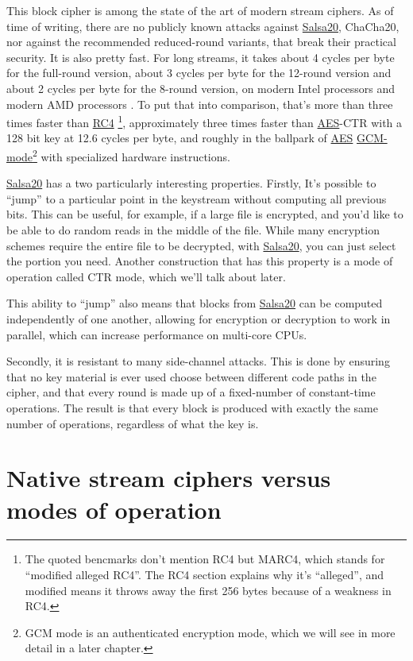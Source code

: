 \documentclass[11pt,ebook,table,dvipsnames]{memoir}
\begin{document}
This block cipher is among the state of the art of modern stream
ciphers. As of time of writing, there are no publicly known attacks
against \hyperref[Salsa20]{Salsa20}, ChaCha20, nor against the recommended reduced-round
variants, that break their practical security. It is also pretty fast.
For long streams, it takes about 4 cycles per byte for the full-round
version, about 3 cycles per byte for the 12-round version and about 2
cycles per byte for the 8-round version, on modern Intel processors
\cite{salsa20:speed} and modern AMD processors \cite{cryptopp:bench}.
To put that into comparison, that's more than three times faster than
\hyperref[RC4]{RC4} \footnote{The quoted bencmarks don't mention RC4 but MARC4, which
stands for \enquote{modified alleged RC4}. The RC4 section explains why it's
\enquote{alleged}, and modified means it throws away the first 256 bytes
because of a weakness in RC4.}, approximately three times faster than
\hyperref[AES]{AES}-CTR with a 128 bit key at 12.6 cycles per byte, and roughly in the
ballpark of \hyperref[AES]{AES} \hyperref[GCM mode]{GCM-mode}\footnote{GCM mode is an authenticated encryption
mode, which we will see in more detail in a later chapter.} with
specialized hardware instructions.

\label{keystream-jump}
\hyperref[Salsa20]{Salsa20} has a two particularly interesting properties. Firstly, It's
possible to \enquote{jump} to a particular point in the keystream without
computing all previous bits. This can be useful, for example, if a
large file is encrypted, and you'd like to be able to do random reads
in the middle of the file. While many encryption schemes require the
entire file to be decrypted, with \hyperref[Salsa20]{Salsa20}, you can just select the
portion you need. Another construction that has this property is a
mode of operation called \gls{CTR mode}, which we'll talk about later.

This ability to \enquote{jump} also means that blocks from \hyperref[Salsa20]{Salsa20} can be
computed independently of one another, allowing for encryption or
decryption to work in parallel, which can increase performance on
multi-core CPUs.

Secondly, it is resistant to many side-channel attacks. This is
done by ensuring that no key material is ever used choose between
different code paths in the cipher, and that every round is made up
of a fixed-number of constant-time operations. The result is that
every block is produced with exactly the same number of operations,
regardless of what the key is.
\section{Native stream ciphers versus modes of operation}
\label{sec-2-3-11}
\end{document}
